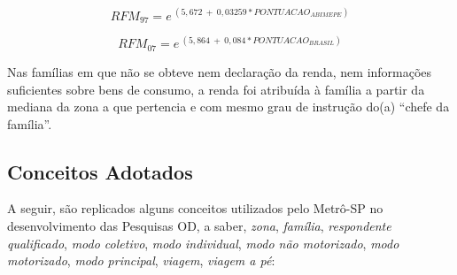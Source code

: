 \begin{equation}\label{eq:reg-renda-97}
RFM_{97} = e^{~(5,672~+~0,03259*PONTUACAO_{ABIMEPE})}
\end{equation}

\begin{equation}\label{eq:reg-renda-07}
RFM_{07} = e^{~(5,864~+~0,084*PONTUACAO_{BRASIL})}
\end{equation}

Nas famílias em que não se obteve nem declaração da renda, nem informações suficientes sobre bens de consumo, a renda foi atribuída à família a partir da mediana da zona a que pertencia e com mesmo grau de instrução do(a) ``chefe da família''.


\subsection{Conceitos Adotados}\label{subsec:conceitos}

A seguir, são replicados alguns conceitos utilizados pelo Metrô-SP no desenvolvimento das Pesquisas OD, a saber, \emph{zona}, \emph{família}, \emph{respondente qualificado}, \emph{modo coletivo}, \emph{modo individual}, \emph{modo não motorizado}, \emph{modo motorizado}, \emph{modo principal}, \emph{viagem}, \emph{viagem a pé}: 

